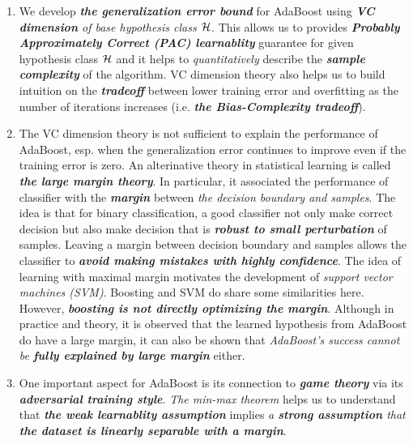 \documentclass[11pt]{article}
\begin{document}
\begin{itemize}
\begin{remark}
\begin{enumerate}
\item We develop \emph{\textbf{the generalization error bound}} for AdaBoost using \emph{\textbf{VC dimension} of base hypothesis class ${\mathcal H}$}. This allows us to provides \emph{\textbf{Probably Approximately Correct (PAC) learnablity}} guarantee for given hypothesis class ${\mathcal H}$ and it helps to \emph{quantitatively} describe the \emph{\textbf{sample complexity}} of the algorithm. VC dimension theory also helps us to build intuition on the \emph{\textbf{tradeoff}} between lower training error and overfitting as the number of iterations increases (i.e. \emph{\textbf{the Bias-Complexity tradeoff}}).

\item The VC dimension theory is not sufficient to explain the performance of AdaBoost, esp. when the generalization error continues to improve even if the training error is zero. An alterinative theory in statistical learning is called \emph{\textbf{the large margin theory}}. In particular, it associated the performance of classifier with the \emph{\textbf{margin}} between \emph{the decision boundary and samples}. The idea is that for binary classification, a good classifier not only make correct decision but also make decision that is \emph{\textbf{robust to small perturbation}} of  samples. Leaving a margin between decision boundary and samples allows the classifier to  \emph{\textbf{avoid making mistakes with highly confidence}}. The idea of learning with maximal margin motivates the development of \emph{support vector machines (SVM)}. Boosting and SVM do share some similarities here. However, \emph{\textbf{boosting is not directly optimizing the margin}}. Although in practice and theory, it is observed that the learned hypothesis from AdaBoost do have a large margin, it can also be shown that \emph{AdaBoost's success cannot be \textbf{fully explained by large margin}} either.

\item One important aspect for AdaBoost is its connection to \emph{\textbf{game theory}} via its \emph{\textbf{adversarial training style}}. \emph{The min-max theorem} helps us to understand that \emph{\textbf{the weak learnablity assumption}} implies \emph{a \textbf{strong assumption} that \textbf{the dataset is linearly separable with a margin}}.


\end{enumerate}
\end{remark}
\end{itemize}
\end{document}
